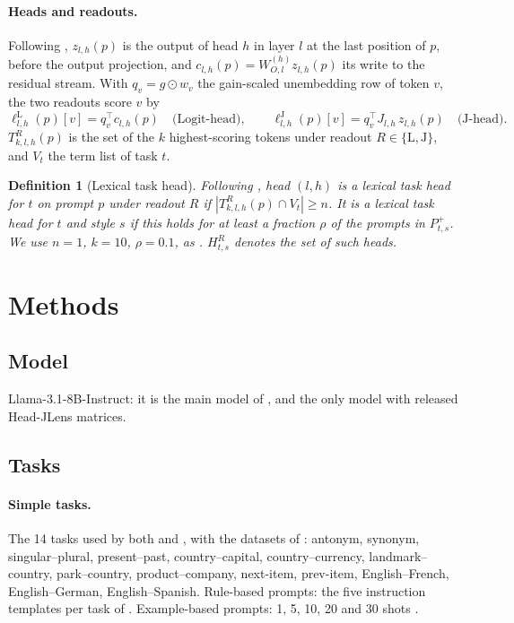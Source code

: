 \documentclass[11pt,a4paper]{article}
\newtheorem{definition}{Definition}
\begin{document}
\paragraph{Heads and readouts.} Following \citet[Sec.~2]{merlo2026headjlens}, $z_{l,h}(p)$ is the output of head $h$ in layer $l$ at the last position of $p$, before the output projection, and $c_{l,h}(p)=W^{(h)}_{O,l}z_{l,h}(p)$ its write to the residual stream. With $q_v=g\odot w_v$ the gain-scaled unembedding row of token $v$, the two readouts score $v$ by
\[
\ell^{\mathrm{L}}_{l,h}(p)[v]=q_v^\top c_{l,h}(p)\quad\text{(Logit-head)},\qquad
\ell^{\mathrm{J}}_{l,h}(p)[v]=q_v^\top J_{l,h}\,z_{l,h}(p)\quad\text{(J-head)}.
\]
$T^{R}_{k,l,h}(p)$ is the set of the $k$ highest-scoring tokens under readout $R\in\{\mathrm{L},\mathrm{J}\}$, and $V_t$ the term list of task $t$.

\begin{definition}[Lexical task head]\label{def:lth}
Following \citet[Sec.~2.2.2]{yang2026shared}, head $(l,h)$ is a lexical task head for $t$ on prompt $p$ under readout $R$ if $|T^{R}_{k,l,h}(p)\cap V_t|\geq n$. It is a lexical task head for $t$ and style $s$ if this holds for at least a fraction $\rho$ of the prompts in $P^{+}_{t,s}$. We use $n=1$, $k=10$, $\rho=0.1$, as \citet{yang2026shared}. $H^{R}_{t,s}$ denotes the set of such heads.
\end{definition}

\section{Methods}\label{sec:methods}

\subsection{Model}\label{sec:model}
Llama-3.1-8B-Instruct: it is the main model of \citet{yang2026shared}, and the only model with released Head-JLens matrices.

\subsection{Tasks}\label{sec:tasks}
\paragraph{Simple tasks.} The 14 tasks used by both \citet{yang2026shared} and \citet{davidson2025different}, with the datasets of \citet{todd2024function}: antonym, synonym, singular--plural, present--past, country--capital, country--currency, landmark--country, park--country, product--company, next-item, prev-item, English--French, English--German, English--Spanish.
Rule-based prompts: the five instruction templates per task of \citet[App.~A.3.1]{yang2026shared}.
Example-based prompts: 1, 5, 10, 20 and 30 shots \citep[App.~A.3]{yang2026shared}.
\end{document}
